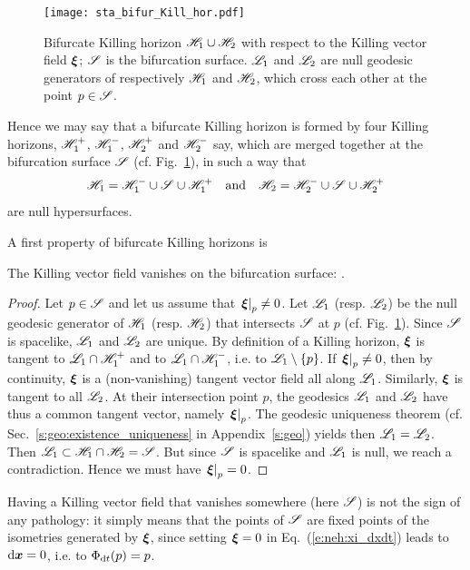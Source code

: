 \begin{figure}
\centerline{\texttt{[image: sta\_bifur\_Kill\_hor.pdf]}}
\caption[]{\label{f:sta:bifur_Kill_hor} \footnotesize
Bifurcate Killing horizon $\mathscr{H}_1\cup\mathscr{H}_2$ with respect to the Killing vector
field $\bm{\xi}$; $\mathscr{S}$ is the bifurcation surface. $\mathscr{L}_1$ and $\mathscr{L}_2$ are
null geodesic generators of respectively $\mathscr{H}_1$ and $\mathscr{H}_2$, which cross
each other at the point $p\in\mathscr{S}$.}
\end{figure}

Hence we may say that a bifurcate Killing horizon is formed by four Killing horizons,
$\mathscr{H}_1^+$, $\mathscr{H}_1^-$, $\mathscr{H}_2^+$ and $\mathscr{H}_2^-$ say,
which are merged together at the bifurcation surface $\mathscr{S}$ (cf. Fig.~\ref{f:sta:bifur_Kill_hor}), in such a way that
\[
    \mathscr{H}_1 = \mathscr{H}_1^- \cup \mathscr{S} \cup \mathscr{H}_1^+ \quad \mbox{and}\quad
    \mathscr{H}_2 = \mathscr{H}_2^- \cup \mathscr{S} \cup \mathscr{H}_2^+
\]
are null hypersurfaces.

A first property of bifurcate Killing horizons is
\begin{prop}
\label{p:sta:xi_S_zero}
The Killing vector field vanishes on the bifurcation surface:
\be \label{e:sta:xi_S_zero}
     .
\ee
\end{prop}
\begin{proof}
Let $p\in \mathscr{S}$ and let us assume that $\left.\bm{\xi}\right| _p\not=0$.
Let $\mathscr{L}_1$ (resp. $\mathscr{L}_2$) be the null geodesic generator of $\mathscr{H}_1$
(resp. $\mathscr{H}_2$) that intersects $\mathscr{S}$ at $p$ (cf. Fig.~\ref{f:sta:bifur_Kill_hor}).
Since $\mathscr{S}$ is spacelike,
$\mathscr{L}_1$ and $\mathscr{L}_2$ are unique. By definition of a Killing horizon,
$\bm{\xi}$ is tangent to $\mathscr{L}_1\cap\mathscr{H}_1^+$ and to $\mathscr{L}_1\cap\mathscr{H}_1^-$,
i.e. to $\mathscr{L}_1\setminus\{p\}$.
If $\left.\bm{\xi}\right| _p \not=0$, then by continuity,
$\bm{\xi}$ is a (non-vanishing) tangent vector field all along $\mathscr{L}_1$.
Similarly, $\bm{\xi}$ is tangent to all $\mathscr{L}_2$.
At their intersection point $p$, the geodesics $\mathscr{L}_1$ and $\mathscr{L}_2$ have thus a common tangent
vector, namely $\left.\bm{\xi}\right| _p$.
The geodesic uniqueness theorem (cf. Sec.~\ref{s:geo:existence_uniqueness} in Appendix~\ref{s:geo})
yields then $\mathscr{L}_1 = \mathscr{L}_2$.
Then $\mathscr{L}_1 \subset \mathscr{H}_1 \cap \mathscr{H}_2 = \mathscr{S}$. But since $\mathscr{S}$ is spacelike and
$\mathscr{L}_1$ is null, we reach a contradiction. Hence we must have
$\left.\bm{\xi}\right| _p = 0$.
\end{proof}

\begin{remark}
\label{r:sta:zero_Killing}
Having a Killing vector field that vanishes somewhere (here $\mathscr{S}$) is not the sign
of any pathology: it simply means that the points of $\mathscr{S}$ are fixed points of
the isometries generated by $\bm{\xi}$, since
setting $\bm{\xi}=0$ in Eq.~(\ref{e:neh:xi_dxdt}) leads to $\mathrm{d}\bm{x}=0$, i.e.
to $\Phi_{\mathrm{d} t}(p) = p$.
\end{remark}

